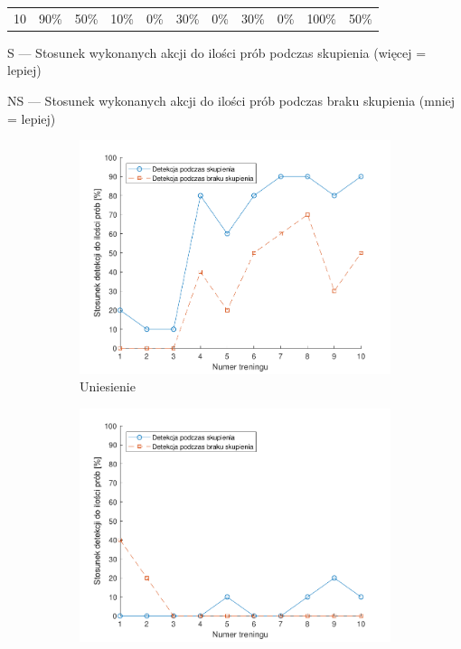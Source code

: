 \documentclass[skorowidz,skroty]{dyplomWEZUT}
\begin{document}
{\begin{landscape}
{\begin{threeparttable}
\begin{tabularx}{\linewidth}{r|X|X|X|X|X|X|X|X|X|X}
                    10 & 90\% & 50\% & 10\% & 0\% & 30\% & 0\% & 30\% & 0\% & 100\% & 50\% \\
                \end{tabularx}
                \begin{tablenotes}
                    \item \hphantom{N}S --- Stosunek wykonanych akcji do ilości prób podczas skupienia (więcej = lepiej)
                    \item NS --- Stosunek wykonanych akcji do ilości prób podczas braku skupienia (mniej = lepiej)
                \end{tablenotes}
            \end{threeparttable}
        }
    \end{landscape}

    \begin{figure}[htbp]
        \begin{subfigure}{0.49\textwidth}
        \includegraphics[width=\linewidth]{graphic/up}
        \caption{Uniesienie\label{fig:training_emotiv_up}}
        \end{subfigure}\hspace*{\fill}
        \begin{subfigure}{0.49\textwidth}
        \includegraphics[width=\linewidth]{graphic/right}

\end{subfigure}
\end{figure}}
\end{document}
